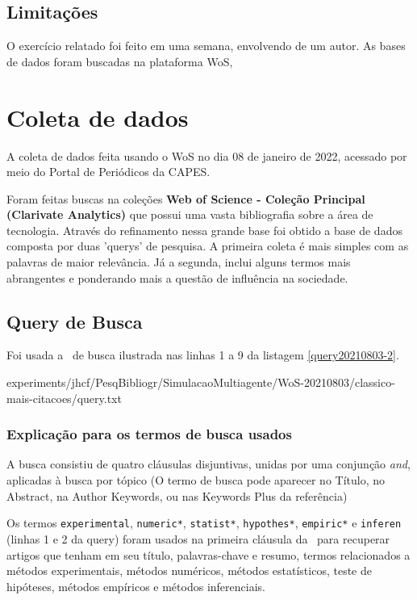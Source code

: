 \subsection{Limitações} O exercício relatado foi feito em uma semana, envolvendo de um autor. As bases de dados foram buscadas na plataforma WoS,


\section{Coleta de dados\label{MASSA:coleta}}

A coleta de dados feita usando o WoS no dia 08 de janeiro de 2022, acessado por meio do Portal de Periódicos da CAPES.

Foram feitas buscas na coleções \textbf{Web of Science - Coleção Principal (Clarivate Analytics) } que possui uma vasta bibliografia sobre a área de tecnologia. Através do refinamento nessa grande base foi obtido a base de dados composta por duas 'querys' de pesquisa. A primeira coleta é mais simples com as palavras de maior relevância. Já a segunda, inclui alguns termos mais abrangentes e ponderando mais a questão de influência na sociedade. 

\subsection{Query de Busca}

Foi usada a \query\  de busca ilustrada nas linhas 1 a 9 da listagem \ref{query20210803-2}.


{experiments/jhcf/PesqBibliogr/SimulacaoMultiagente/WoS-20210803/classico-mais-citacoes/query.txt}

\subsubsection{Explicação para os termos de busca usados\label{MASSA:query}}

A busca consistiu de quatro cláusulas disjuntivas, unidas por uma conjunção \textit{and}, aplicadas à busca por tópico (O termo de busca pode aparecer no Título, no Abstract, na Author Keywords, ou nas Keywords Plus da referência)

Os termos \texttt{experimental}, \texttt{numeric*}, \texttt{statist*}, \texttt{hypothes*}, 
\texttt{empiric*}
e \texttt{inferen} (linhas 1 e 2 da query) foram usados na primeira cláusula da \query\  para recuperar artigos que tenham em seu título, palavras-chave e resumo, termos relacionados a métodos experimentais,
métodos numéricos,
métodos estatísticos,
teste de hipóteses,
métodos empíricos e métodos inferenciais.

